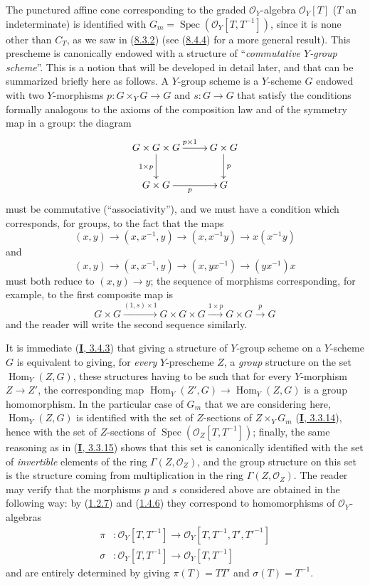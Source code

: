 \begin{remark}[8.3.9]
\label{II.8.3.9}
The punctured affine cone corresponding to the graded $\mathcal{O}_Y$-algebra
$\mathcal{O}_Y[T]$ ($T$ an indeterminate) is identified with
$G_m=\operatorname{Spec}(\mathcal{O}_Y[T,T^{-1}])$, since it is none other than
$C_T$, as we saw in (\hyperref[II.8.3.2]{8.3.2}) (see
(\hyperref[II.8.4.4]{8.4.4}) for a more general result). This prescheme
is canonically endowed with a structure of ``\emph{commutative $Y$-group
scheme}''. This is a notion that will be developed in detail later,
and that can be summarized briefly here as follows. A $Y$-group
scheme is a $Y$-scheme $G$ endowed with two $Y$-morphisms
$p:G\times_YG\to G$ and $s:G\to G$ that satisfy the conditions formally
analogous to the axioms of the composition law and of the symmetry map
in a group: the diagram
\[
  \xymatrix{
    G\times G\times G \ar[r]^{p\times1}\ar[d]_{1\times p}
      & G\times G \ar[d]^{p} \\
    G\times G \ar[r]_{p} & G
  }
\]
must be commutative (``associativity''), and we must have a condition which
corresponds, for groups, to the fact that the maps
\[
  (x,y)\to(x,x^{-1},y)\to(x,x^{-1}y)\to x(x^{-1}y)
\]
and
\[
  (x,y)\to(x,x^{-1},y)\to(x,yx^{-1})\to(yx^{-1})x
\]
must both reduce to $(x,y)\to y$; the sequence of morphisms
corresponding, for example, to the first composite map is
\[
  G\times G\xrightarrow{(1,s)\times1}G\times G\times G
  \xrightarrow{1\times p}G\times G\xrightarrow{p}G
\]
and the reader will write the second sequence similarly.

It is immediate (\hyperref[I.3.4.3]{\textbf{I}, 3.4.3}) that giving a structure
of $Y$-group scheme on a $Y$-scheme $G$ is equivalent to giving, for
\emph{every} $Y$-prescheme $Z$, a \emph{group} structure on
the set $\operatorname{Hom}_Y(Z,G)$, these structures having to be such that
for every $Y$-morphism $Z\to Z'$, the corresponding map
$\operatorname{Hom}_Y(Z',G)\to\operatorname{Hom}_Y(Z,G)$ is a
group homomorphism. In the particular case of $G_m$ that we are
considering here, $\operatorname{Hom}_Y(Z,G)$ is identified with the set of
$Z$-sections of $Z\times_YG_m$ (\hyperref[I.3.3.14]{\textbf{I}, 3.3.14}), hence with
the set of $Z$-sections of
$\operatorname{Spec}(\mathcal{O}_Z[T,T^{-1}])$; finally, the same
reasoning as in (\hyperref[I.3.3.15]{\textbf{I}, 3.3.15}) shows that this
set is canonically identified with the set of \emph{invertible} elements
of the ring $\Gamma(Z,\mathcal{O}_Z)$, and the group structure on this
set is the structure coming from multiplication in the ring
$\Gamma(Z,\mathcal{O}_Z)$. The reader may verify that the morphisms $p$
and $s$ considered above are obtained in the following way: by
(\hyperref[II.1.2.7]{1.2.7}) and
(\hyperref[II.1.4.6]{1.4.6}) they correspond to homomorphisms of $\mathcal{O}_Y$-algebras
\begin{align*}
  \pi &: \mathcal{O}_Y[T,T^{-1}]
  \to\mathcal{O}_Y[T,T^{-1},T',T'^{-1}]\\
  \sigma &: \mathcal{O}_Y[T,T^{-1}]\to\mathcal{O}_Y[T,T^{-1}]
\end{align*}
and are entirely determined by giving $\pi(T)=TT'$ and
$\sigma(T)=T^{-1}$.


\end{remark}
